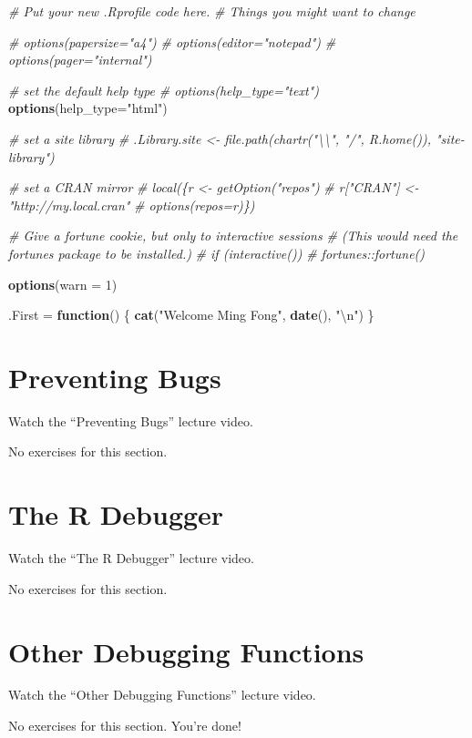 \documentclass[
]{article}
\newenvironment{Shaded}{\begin{snugshade}}{\end{snugshade}}
\newcommand{\CharTok}[1]{\textcolor[rgb]{0.31,0.60,0.02}{#1}}
\newcommand{\CommentTok}[1]{\textcolor[rgb]{0.56,0.35,0.01}{\textit{#1}}}
\newcommand{\ControlFlowTok}[1]{\textcolor[rgb]{0.13,0.29,0.53}{\textbf{#1}}}
\newcommand{\DataTypeTok}[1]{\textcolor[rgb]{0.13,0.29,0.53}{#1}}
\newcommand{\DecValTok}[1]{\textcolor[rgb]{0.00,0.00,0.81}{#1}}
\newcommand{\KeywordTok}[1]{\textcolor[rgb]{0.13,0.29,0.53}{\textbf{#1}}}
\newcommand{\NormalTok}[1]{#1}
\newcommand{\StringTok}[1]{\textcolor[rgb]{0.31,0.60,0.02}{#1}}
\begin{document}
\begin{Shaded}
\begin{Highlighting}[]
\CommentTok{\# Put your new .Rprofile code here.}
\CommentTok{\# Things you might want to change}

\CommentTok{\# options(papersize="a4")}
\CommentTok{\# options(editor="notepad")}
\CommentTok{\# options(pager="internal")}

\CommentTok{\# set the default help type}
\CommentTok{\# options(help\_type="text")}
  \KeywordTok{options}\NormalTok{(}\DataTypeTok{help\_type=}\StringTok{"html"}\NormalTok{)}

\CommentTok{\# set a site library}
\CommentTok{\# .Library.site \textless{}{-} file.path(chartr("\textbackslash{}\textbackslash{}", "/", R.home()), "site{-}library")}

\CommentTok{\# set a CRAN mirror}
\CommentTok{\# local(\{r \textless{}{-} getOption("repos")}
\CommentTok{\#       r["CRAN"] \textless{}{-} "http://my.local.cran"}
\CommentTok{\#       options(repos=r)\})}

\CommentTok{\# Give a fortune cookie, but only to interactive sessions}
\CommentTok{\# (This would need the fortunes package to be installed.)}
\CommentTok{\#  if (interactive()) }
\CommentTok{\#    fortunes::fortune()}

\KeywordTok{options}\NormalTok{(}\DataTypeTok{warn =} \DecValTok{1}\NormalTok{)}

\NormalTok{.First =}\StringTok{ }\ControlFlowTok{function}\NormalTok{() \{}
  \KeywordTok{cat}\NormalTok{(}\StringTok{"Welcome Ming Fong"}\NormalTok{, }\KeywordTok{date}\NormalTok{(), }\StringTok{"}\CharTok{\textbackslash{}n}\StringTok{"}\NormalTok{)}
\NormalTok{\}}
\end{Highlighting}
\end{Shaded}

\hypertarget{preventing-bugs}{%
\section{Preventing Bugs}\label{preventing-bugs}}

Watch the ``Preventing Bugs'' lecture video.

No exercises for this section.

\hypertarget{the-r-debugger}{%
\section{The R Debugger}\label{the-r-debugger}}

Watch the ``The R Debugger'' lecture video.

No exercises for this section.

\hypertarget{other-debugging-functions}{%
\section{Other Debugging Functions}\label{other-debugging-functions}}

Watch the ``Other Debugging Functions'' lecture video.

No exercises for this section. You're done!
\end{document}
